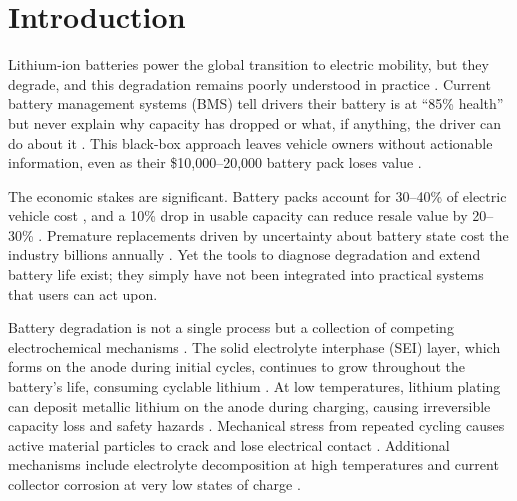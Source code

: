 \documentclass[5p,times,authoryear]{elsarticle}
\begin{document}

\section{Introduction}


Lithium-ion batteries power the global transition to electric mobility, but they degrade, and this degradation remains poorly understood in practice \citep{vetter2005ageing, barre2013review}. Current battery management systems (BMS) tell drivers their battery is at ``85\% health'' but never explain why capacity has dropped or what, if anything, the driver can do about it \citep{waag2014critical, berecibar2016critical}. This black-box approach leaves vehicle owners without actionable information, even as their \$10,000--20,000 battery pack loses value \citep{harper2019recycling}.

The economic stakes are significant. Battery packs account for 30--40\% of electric vehicle cost \citep{ziegler2021determinants}, and a 10\% drop in usable capacity can reduce resale value by 20--30\% \citep{saxena2019quantifying}. Premature replacements driven by uncertainty about battery state cost the industry billions annually \citep{harper2019recycling}. Yet the tools to diagnose degradation and extend battery life exist; they simply have not been integrated into practical systems that users can act upon.


Battery degradation is not a single process but a collection of competing electrochemical mechanisms \citep{vetter2005ageing, edge2021lithium}. The solid electrolyte interphase (SEI) layer, which forms on the anode during initial cycles, continues to grow throughout the battery's life, consuming cyclable lithium \citep{peled1979electrochemical}. At low temperatures, lithium plating can deposit metallic lithium on the anode during charging, causing irreversible capacity loss and safety hazards \citep{waldmann2014temperature}. Mechanical stress from repeated cycling causes active material particles to crack and lose electrical contact \citep{zhang2020degradation}. Additional mechanisms include electrolyte decomposition at high temperatures and current collector corrosion at very low states of charge \citep{vetter2005ageing}.
\end{document}
